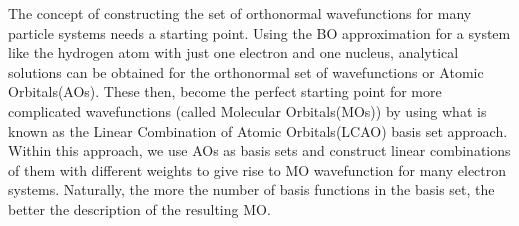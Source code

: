             The concept of constructing the set of orthonormal wavefunctions for many particle systems needs a starting point. Using the BO approximation for a system like the hydrogen atom with just one electron and one nucleus, analytical solutions can be obtained for the orthonormal set of wavefunctions or Atomic Orbitals(AOs). These then, become the perfect starting point for more complicated wavefunctions (called Molecular Orbitals(MOs)) by using what is known as the Linear Combination of Atomic Orbitals(LCAO) basis set approach. Within this approach, we use AOs as basis sets and construct linear combinations of them with different weights to give rise to MO wavefunction for many electron systems. Naturally, the more the number of basis functions in the basis set, the better the description of the resulting MO.

